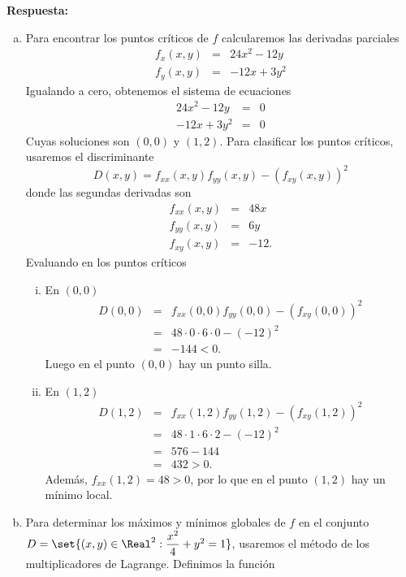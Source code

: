 \documentclass{article}
\begin{document}
\vspace{5mm}
\noindent\textbf{Respuesta:}
\begin{enumerate}[a)]
  \item Para encontrar los puntos críticos de $f$ calcularemos las derivadas parciales
      \begin{eqnarray*}
        f_x(x,y) &=& 24x^2 - 12y \\
        f_y(x,y) &=& -12x + 3y^2
      \end{eqnarray*}
    Igualando a cero, obtenemos el sistema de ecuaciones
      \begin{eqnarray*}
        24x^2 - 12y &=& 0 \\
        -12x + 3y^2 &=& 0
      \end{eqnarray*}
    Cuyas soluciones son $(0,0)$ y $(1,2)$. Para clasificar los puntos críticos, usaremos el discriminante
      $$D(x,y) = f_{xx}(x,y)f_{yy}(x,y) - (f_{xy}(x,y))^2$$
    donde las segundas derivadas son
      \begin{eqnarray*}
        f_{xx}(x,y) &=& 48x \\
        f_{yy}(x,y) &=& 6y \\
        f_{xy}(x,y) &=& -12.
      \end{eqnarray*}
    Evaluando en los puntos críticos
    \begin{enumerate}[i)]
      \item En $(0,0)$
        \begin{eqnarray*}
          D(0,0) &=& f_{xx}(0,0)f_{yy}(0,0) - (f_{xy}(0,0))^2 \\
            &=& 48\cdot 0\cdot 6\cdot 0 - (-12)^2 \\
            &=& -144 < 0.
        \end{eqnarray*}
        Luego en el punto $(0,0)$ hay un punto silla.
      \item En $(1,2)$
        \begin{eqnarray*}
          D(1,2) &=& f_{xx}(1,2)f_{yy}(1,2) - (f_{xy}(1,2))^2 \\
            &=& 48\cdot 1\cdot 6\cdot 2 - (-12)^2 \\
            &=& 576 - 144 \\
            &=& 432 > 0.
        \end{eqnarray*}
        Además, $f_{xx}(1,2) = 48 > 0$, por lo que en el punto $(1,2)$ hay un mínimo local.
    \end{enumerate}
  \item Para determinar los máximos y mínimos globales de $f$ en el conjunto $D = \set{(x,y) \in \Real^2 : \dfrac{x^2}{4}+y^2 = 1}$, usaremos el método de los multiplicadores de Lagrange. Definimos la función

\end{enumerate}
\end{document}
